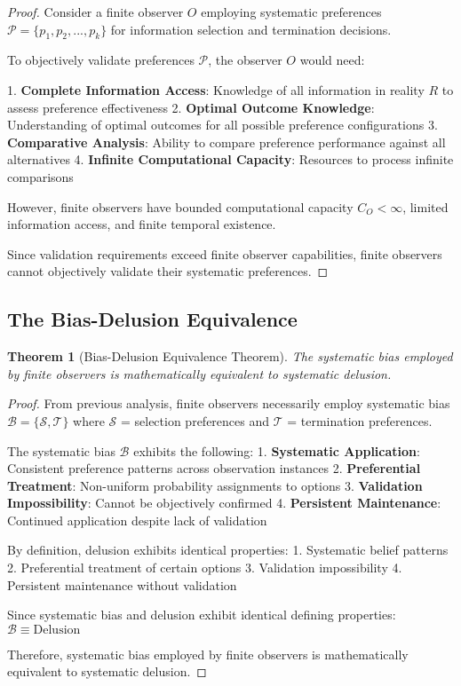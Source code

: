 \documentclass[12pt,a4paper]{article}
\newtheorem{theorem}{Theorem}[section]
\begin{document}
\begin{proof}
Consider a finite observer $O$ employing systematic preferences $\mathcal{P} = \{p_1, p_2, ..., p_k\}$ for information selection and termination decisions.

To objectively  validate preferences $\mathcal{P}$, the observer $O$ would need:

1. \textbf{Complete Information Access}: Knowledge of all information in reality $R$ to assess preference effectiveness
2. \textbf{Optimal Outcome Knowledge}: Understanding of optimal outcomes for all possible preference configurations  
3. \textbf{Comparative Analysis}: Ability to compare preference performance against all alternatives
4. \textbf{Infinite Computational Capacity}: Resources to process infinite comparisons

However, finite observers have bounded computational capacity $C_O < \infty$, limited information access, and finite temporal existence.

Since validation requirements exceed finite observer capabilities, finite observers cannot objectively validate their systematic preferences.
\end{proof}

\subsection{The Bias-Delusion Equivalence}

\begin{theorem}[Bias-Delusion Equivalence Theorem]
The systematic bias employed by finite observers is mathematically equivalent to systematic delusion.
\end{theorem}

\begin{proof}
From previous analysis, finite observers necessarily employ systematic bias $\mathcal{B} = \{\mathcal{S}, \mathcal{T}\}$ where $\mathcal{S}$ = selection preferences and $\mathcal{T}$ = termination preferences.

The systematic  bias $\mathcal{B}$ exhibits the following:
1. \textbf{Systematic Application}: Consistent preference patterns across observation instances
2. \textbf{Preferential Treatment}: Non-uniform probability assignments to options
3. \textbf{Validation Impossibility}: Cannot be objectively confirmed
4. \textbf{Persistent Maintenance}: Continued application despite lack of validation

By definition, delusion exhibits identical properties:
1. Systematic belief patterns
2. Preferential treatment of certain options
3. Validation impossibility  
4. Persistent maintenance without validation

Since systematic bias and delusion exhibit identical defining properties: $\mathcal{B} \equiv \text{Delusion}$

Therefore, systematic bias employed by finite observers is mathematically equivalent to systematic delusion.
\end{proof}
\end{document}

